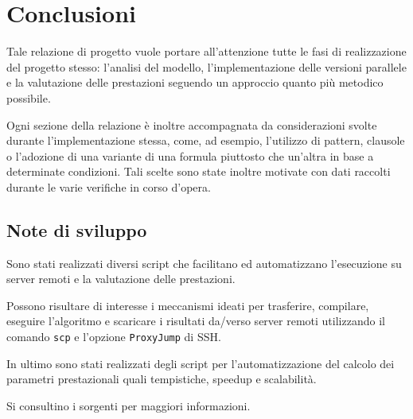 \section{Conclusioni}

Tale relazione di progetto vuole portare all'attenzione tutte le fasi di
realizzazione del progetto stesso: l'analisi del modello, l'implementazione
delle versioni parallele e la valutazione delle prestazioni seguendo un
approccio quanto più metodico possibile.

Ogni sezione della relazione è inoltre accompagnata da considerazioni svolte
durante l'implementazione stessa, come, ad esempio, l'utilizzo di pattern,
clausole o l'adozione di una variante di una formula piuttosto che un'altra in
base a determinate condizioni.  Tali scelte sono state inoltre motivate con dati
raccolti durante le varie verifiche in corso d'opera.

\subsection{Note di sviluppo}

Sono stati realizzati diversi script che facilitano ed automatizzano
l'esecuzione su server remoti e la valutazione delle prestazioni.

Possono risultare di interesse i meccanismi ideati per trasferire, compilare,
eseguire l'algoritmo e scaricare i risultati da/verso server remoti utilizzando
il comando \texttt{scp} e l'opzione \texttt{ProxyJump} di SSH.

In ultimo sono stati realizzati degli script per l'automatizzazione del calcolo
dei parametri prestazionali quali tempistiche, speedup e scalabilità.

Si consultino i sorgenti per maggiori informazioni.
